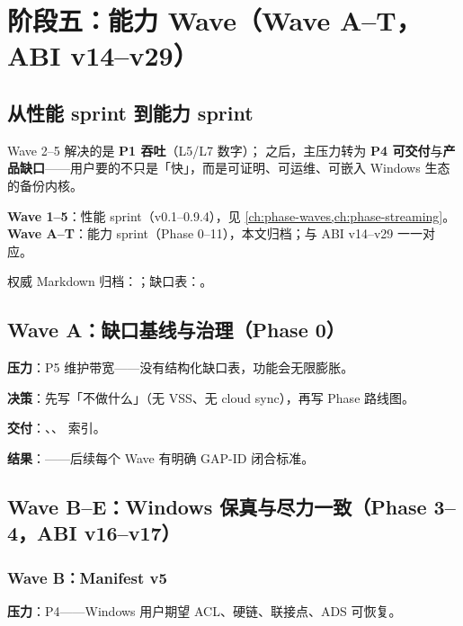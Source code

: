 \chapter{阶段五：能力 Wave（Wave A--T，ABI v14--v29）}
\label{ch:phase-capability-waves}

\section{从性能 sprint 到能力 sprint}

Wave 2--5 解决的是 \textbf{P1 吞吐}（L5/L7 数字）； 之后，主压力转为 \textbf{P4 可交付}与\textbf{产品缺口}——用户要的不只是「快」，而是可证明、可运维、可嵌入 Windows 生态的备份内核。

\begin{philobox}[两套 Wave 编号]
\textbf{Wave 1--5}：性能 sprint（v0.1--0.9.4），见 \cref{ch:phase-waves,ch:phase-streaming}。\\
\textbf{Wave A--T}：能力 sprint（Phase 0--11），本文归档；与 ABI v14--v29 一一对应。
\end{philobox}

权威 Markdown 归档：；缺口表：。

\section{Wave A：缺口基线与治理（Phase 0）}

\textbf{压力}：P5 维护带宽——没有结构化缺口表，功能会无限膨胀。

\textbf{决策}：先写「不做什么」（无 VSS、无 cloud sync），再写 Phase 路线图。

\textbf{交付}：、、 索引。

\textbf{结果}：——后续每个 Wave 有明确 GAP-ID 闭合标准。

\section{Wave B--E：Windows 保真与尽力一致（Phase 3--4，ABI v16--v17）}

\subsection{Wave B：Manifest v5}

\textbf{压力}：P4——Windows 用户期望 ACL、硬链、联接点、ADS 可恢复。

